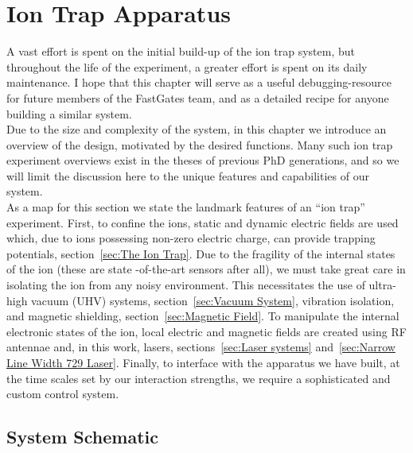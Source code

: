 \chapter{Ion Trap Apparatus}
\minitoc

    A vast effort is spent on the initial build-up of the ion trap system, but
    throughout the life of the experiment, a greater effort is spent on its daily
    maintenance.  I hope that this chapter will serve as a useful debugging-resource for future
    members of the FastGates team, and as a detailed recipe for anyone
    building a similar system. \\

    Due to the size and complexity of the system, in this chapter we introduce an overview of
    the design, motivated by the desired functions.  
    Many such  ion trap experiment overviews exist in the theses of previous PhD
    generations, and so we will limit the discussion here to the unique features
    and capabilities of our system.\\
    As a map for this section we state the landmark features of an ``ion trap''
    experiment. First, to confine the ions, static and dynamic electric fields
    are used which, due to ions possessing non-zero electric charge, can provide
    trapping potentials, section~\ref{sec:The Ion Trap}. Due to the fragility of
    the internal states of the ion (these are state -of-the-art sensors after
    all), we must take great care in isolating the ion from any noisy
    environment. This necessitates the use of ultra-high vacuum (UHV) systems,
    section~\ref{sec:Vacuum System}, vibration isolation, and magnetic
    shielding, section~\ref{sec:Magnetic Field}. To manipulate the internal
    electronic states of the ion, local electric and magnetic fields
    are created using RF antennae and, in this work, lasers, sections~\ref{sec:Laser
    systems} and~\ref{sec:Narrow Line Width 729 Laser}.  Finally, to interface
    with the apparatus we have built, at the time scales set by our interaction
    strengths, we require a sophisticated and custom control system.

\section{System Schematic}

